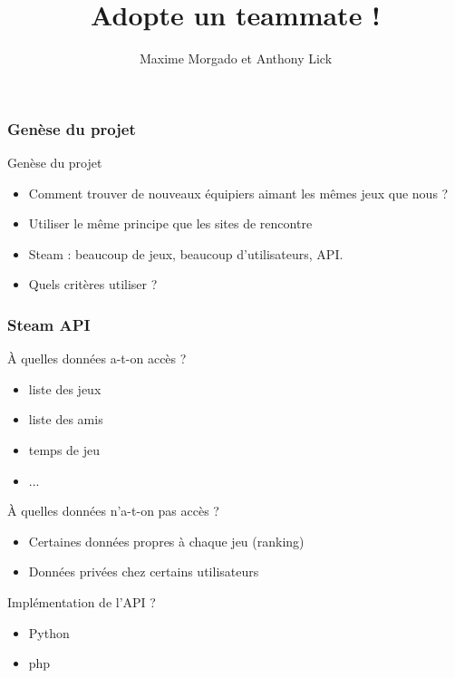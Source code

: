 \documentclass[10pt]{beamer}
\title{Adopte un teammate ! }
\author{Maxime Morgado et Anthony Lick}
\begin{document}
\begin{frame}
 \maketitle
\end{frame}

\begin{frame}
\frametitle{Genèse du projet}
\begin{block}{Genèse du projet}
\begin{itemize}
 \item Comment trouver de nouveaux équipiers aimant les mêmes jeux que nous ?
 \item Utiliser le même principe que les sites de rencontre 
 \pause \item Steam : beaucoup de jeux, beaucoup d'utilisateurs, API.
 \pause \item Quels critères utiliser ? 
\end{itemize}
\end{block}
\end{frame}

\begin{frame}
 \frametitle{Steam API}
 
\begin{block}{À quelles données a-t-on accès ?}
   {
  \begin{itemize}
   \item liste des jeux
   \item liste des amis
   \item temps de jeu 
   \item ...
  \end{itemize}
  }
\end{block}
\begin{block}{À quelles données n'a-t-on pas accès ?}
   {
  \begin{itemize}
   \item Certaines données propres à chaque jeu (ranking)
   \item Données privées chez certains utilisateurs 
  \end{itemize}
  }
\end{block}
\begin{block}{Implémentation de l'API ?}
   {
  \begin{itemize}
   \item Python
   \item php
  \end{itemize}
  }
\end{block}
 
\end{frame}
\end{document}
